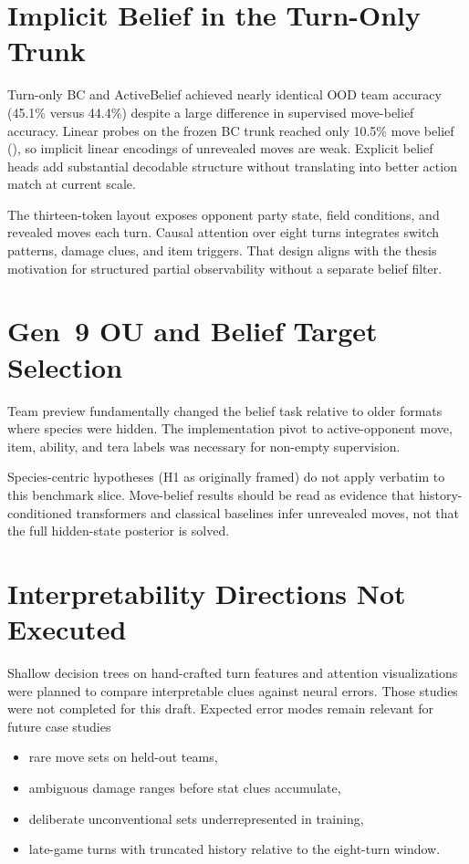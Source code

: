 \section{Implicit Belief in the Turn-Only Trunk}

Turn-only BC and ActiveBelief achieved nearly identical OOD team accuracy
(45.1\% versus 44.4\%) despite a large difference in supervised move-belief
accuracy. Linear probes on the frozen BC trunk reached only 10.5\% move belief
(), so implicit linear encodings of unrevealed moves are
weak. Explicit belief heads add substantial decodable structure without
translating into better action match at current scale.

The thirteen-token layout exposes opponent party state, field conditions, and
revealed moves each turn. Causal attention over eight turns integrates switch
patterns, damage clues, and item triggers. That design aligns with the thesis
motivation for structured partial observability without a separate belief filter.

\section{Gen~9 OU and Belief Target Selection}

Team preview fundamentally changed the belief task relative to older formats
where species were hidden. The implementation pivot to active-opponent move,
item, ability, and tera labels was necessary for non-empty supervision.

Species-centric hypotheses (H1 as originally framed) do not apply verbatim to this
benchmark slice. Move-belief results should be read as evidence that history-
conditioned transformers and classical baselines infer unrevealed moves, not that
the full hidden-state posterior is solved.

\section{Interpretability Directions Not Executed}

Shallow decision trees on hand-crafted turn features and attention visualizations
were planned to compare interpretable clues against neural errors. Those studies
were not completed for this draft. Expected error modes remain relevant for
future case studies
\begin{itemize}
  \item rare move sets on held-out teams,
  \item ambiguous damage ranges before stat clues accumulate,
  \item deliberate unconventional sets underrepresented in training,
  \item late-game turns with truncated history relative to the eight-turn window.
\end{itemize}

